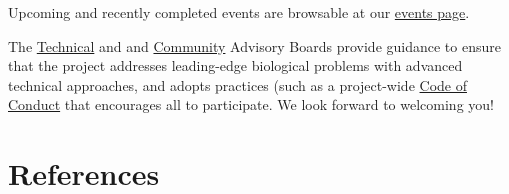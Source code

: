 Upcoming and recently completed events are browsable at our
\href{https://bioconductor.org/help/events/}{events page}.

The \href{https://bioconductor.org/about/technical-advisory-board/}{Technical}
and and \href{https://bioconductor.org/about/community-advisory-board/}{Community}
Advisory Boards provide guidance to ensure that the project addresses
leading-edge biological problems with advanced technical approaches,
and adopts practices (such as a
project-wide \href{https://bioconductor.org/about/code-of-conduct/}{Code of Conduct}
that encourages all to participate. We look forward to
welcoming you!

\hypertarget{references}{%
\section{References}\label{references}}



\address{%
Maria Doyle\\
University of Limerick,Bioconductor Community Manager\\%
\\
%
%
%
%
}

\address{%
Bioconductor Core Developer Team\\
Dana-Farber Cancer Institute, Roswell Park Comprehensive Cancer Center, City University of New York, Fred Hutchinson Cancer Research Center, Mass General Brigham\\%
\\
%
%
%
%
}
